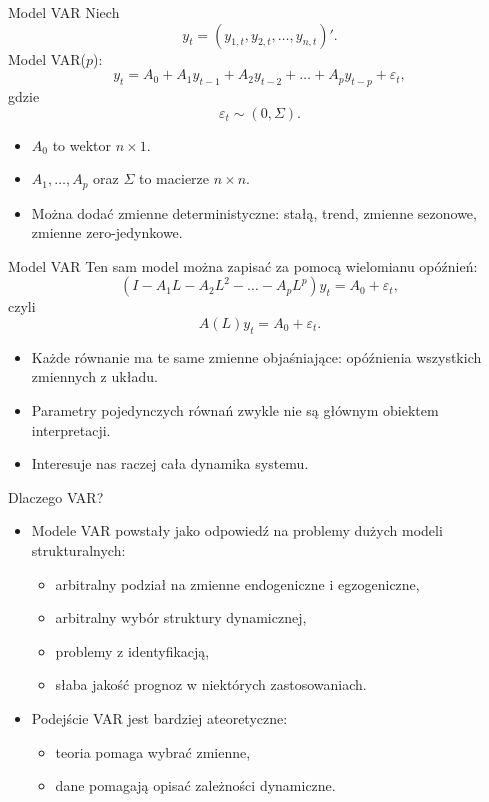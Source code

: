 \documentclass[11pt,aspectratio=169,xcolor=dvipsnames]{beamer}
\begin{document}
\begin{frame}{Model VAR}
  Niech
  \[
    y_t = (y_{1,t}, y_{2,t}, \ldots, y_{n,t})'.
  \]
  Model VAR($p$):
  \[
    y_t = A_0 + A_1 y_{t-1} + A_2 y_{t-2} + \ldots + A_p y_{t-p} + \varepsilon_t,
  \]
  gdzie
  \[
    \varepsilon_t \sim (0,\Sigma).
  \]

  \begin{itemize}
    \item $A_0$ to wektor $n \times 1$.
    \item $A_1,\ldots,A_p$ oraz $\Sigma$ to macierze $n \times n$.
    \item Można dodać zmienne deterministyczne: stałą, trend, zmienne sezonowe, zmienne zero-jedynkowe.
  \end{itemize}
\end{frame}

\begin{frame}{Model VAR}
  Ten sam model można zapisać za pomocą wielomianu opóźnień:
  \[
    \left(I - A_1L - A_2L^2 - \ldots - A_pL^p\right)y_t = A_0 + \varepsilon_t,
  \]
  czyli
  \[
    A(L)y_t = A_0 + \varepsilon_t.
  \]

  \begin{itemize}
    \item Każde równanie ma te same zmienne objaśniające: opóźnienia wszystkich zmiennych z układu.
    \item Parametry pojedynczych równań zwykle nie są głównym obiektem interpretacji.
    \item Interesuje nas raczej cała dynamika systemu.
  \end{itemize}
\end{frame}

\begin{frame}{Dlaczego VAR?}
  \begin{itemize}
    \item Modele VAR powstały jako odpowiedź na problemy dużych modeli strukturalnych:
      \begin{itemize}
        \item arbitralny podział na zmienne endogeniczne i egzogeniczne,
        \item arbitralny wybór struktury dynamicznej,
        \item problemy z identyfikacją,
        \item słaba jakość prognoz w niektórych zastosowaniach.
      \end{itemize}
    \item Podejście VAR jest bardziej ateoretyczne:
      \begin{itemize}
        \item teoria pomaga wybrać zmienne,
        \item dane pomagają opisać zależności dynamiczne.
      \end{itemize}
  \end{itemize}
\end{frame}
\end{document}
